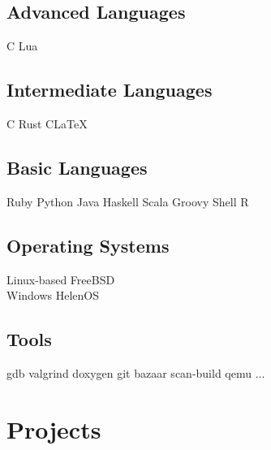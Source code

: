 \documentclass[8pt]{article}
\newcommand\csharp{C\scalerel*{\#}{X}}
\def\cpp{{C\nolinebreak[4]\hspace{-.05em}\raisebox{.4ex}{\tiny\bf ++\xspace}}}
\newcommand\bt{\large\xspace{\bf\textperiodcentered}\xspace}
\begin{document}
\begin{minipage}[t]{0.35\textwidth}

\centering

\subsection*{Advanced Languages}
\cpp \bt Lua

\subsection*{Intermediate Languages}
C \bt Rust \bt \csharp \bt \LaTeX

\subsection*{Basic Languages}
Ruby \bt Python \bt Java \bt Haskell
Scala \bt Groovy \bt Shell \bt R

\subsection*{Operating Systems}
Linux-based \bt FreeBSD \\
Windows \bt HelenOS

\subsection*{Tools}
gdb \bt valgrind \bt doxygen \bt git
bazaar \bt scan-build \bt qemu ...

\end{minipage}

\centering
\section*{Projects}
\end{document}
